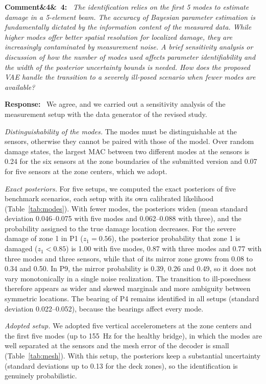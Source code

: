 \documentclass[11pt]{article}
\newenvironment{rcomment}[1]{\par\bigskip\noindent\textbf{Comment\ifx&#1&\else\ #1\fi:}\ \itshape}{\par}
\newenvironment{response}{\par\smallskip\noindent\color{resp}\textbf{Response:}\ }{\par}
\begin{document}
\begin{rcomment}{4}
The identification relies on the first 5 modes to estimate damage in a 5-element beam. The accuracy of Bayesian
parameter estimation is fundamentally dictated by the information content of the measured data. While higher modes
offer better spatial resolution for localized damage, they are increasingly contaminated by measurement noise. A brief
sensitivity analysis or discussion of how the number of modes used affects parameter identifiability and the width of
the posterior uncertainty bounds is needed. How does the proposed VAE handle the transition to a severely ill-posed
scenario when fewer modes are available?
\end{rcomment}

\begin{response}
We agree, and we carried out a sensitivity analysis of the measurement setup with the data generator of the revised
study.

\textit{Distinguishability of the modes.} The modes must be distinguishable at the sensors, otherwise they cannot be
paired with those of the model. Over random damage states, the largest MAC between two different modes at the sensors is
0.24 for the six sensors at the zone boundaries of the submitted version and 0.07 for five sensors at the
zone centers, which we adopt.

\textit{Exact posteriors.} For five setups, we computed the exact posteriors of five benchmark scenarios, each setup with
its own calibrated likelihood (Table~\ref{tab:modes}). With fewer modes, the posteriors widen (mean standard deviation
0.046--0.075 with five modes and 0.062--0.088 with three), and the probability assigned to the true damage location
decreases. For the severe damage of zone 1 in P1 ($z_1=0.56$), the posterior probability that zone 1 is damaged ($z_1<0.85$) is 1.00 with five modes,
0.87 with three modes and 0.77 with three modes and three sensors, while that of its mirror zone grows from 0.08 to 0.34 and 0.50. In P9, the mirror
probability is 0.39, 0.26 and 0.49, so it does not vary monotonically in a single noise realization. The transition to ill-posedness therefore appears as wider and skewed marginals and more ambiguity between
symmetric locations. The bearing of P4 remains identified in all setups (standard deviation 0.022--0.052), because the bearings affect every mode.

\textit{Adopted setup.} We adopted five vertical accelerometers at the zone centers and the first five modes (up to
155~Hz for the healthy bridge), in which the modes are well separated at the sensors and the mesh error of the decoder is small
(Table~\ref{tab:mesh}). With this setup, the posteriors keep a substantial uncertainty (standard deviations up to 0.13 for the deck zones), so the
identification is genuinely probabilistic.


\end{response}
\end{document}
